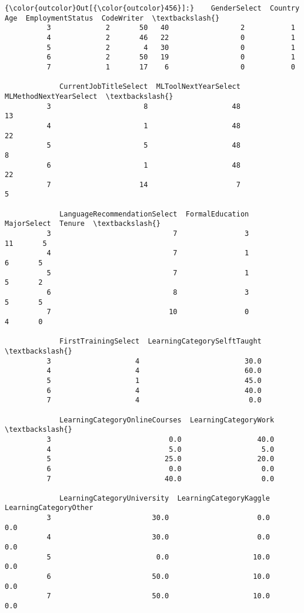 \documentclass[11pt]{article}
\begin{document}
\begin{Verbatim}[commandchars=\\\{\}]
{\color{outcolor}Out[{\color{outcolor}456}]:}    GenderSelect  Country  Age  EmploymentStatus  CodeWriter  \textbackslash{}
          3             2       50   40                 2           1   
          4             2       46   22                 0           1   
          5             2        4   30                 0           1   
          6             2       50   19                 0           1   
          7             1       17    6                 0           0   
          
             CurrentJobTitleSelect  MLToolNextYearSelect  MLMethodNextYearSelect  \textbackslash{}
          3                      8                    48                      13   
          4                      1                    48                      22   
          5                      5                    48                       8   
          6                      1                    48                      22   
          7                     14                     7                       5   
          
             LanguageRecommendationSelect  FormalEducation  MajorSelect  Tenure  \textbackslash{}
          3                             7                3           11       5   
          4                             7                1            6       5   
          5                             7                1            5       2   
          6                             8                3            5       5   
          7                            10                0            4       0   
          
             FirstTrainingSelect  LearningCategorySelftTaught  \textbackslash{}
          3                    4                         30.0   
          4                    4                         60.0   
          5                    1                         45.0   
          6                    4                         40.0   
          7                    4                          0.0   
          
             LearningCategoryOnlineCourses  LearningCategoryWork  \textbackslash{}
          3                            0.0                  40.0   
          4                            5.0                   5.0   
          5                           25.0                  20.0   
          6                            0.0                   0.0   
          7                           40.0                   0.0   
          
             LearningCategoryUniversity  LearningCategoryKaggle  LearningCategoryOther  
          3                        30.0                     0.0                    0.0  
          4                        30.0                     0.0                    0.0  
          5                         0.0                    10.0                    0.0  
          6                        50.0                    10.0                    0.0  
          7                        50.0                    10.0                    0.0  
\end{Verbatim}
            
\end{document}
